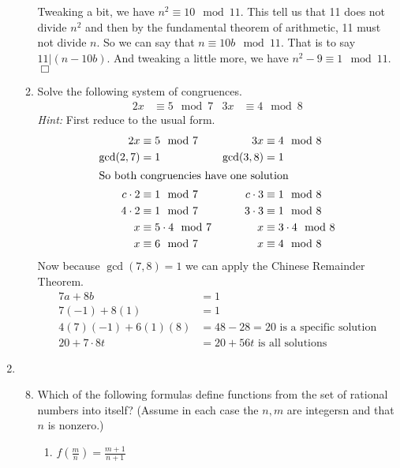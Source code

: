 \documentclass[letterpaper]{article}
\begin{document}
\begin{enumerate}
\begin{enumerate}
Tweaking a bit, we have $n^2\equiv10\mod11$.
This tell us that 11 does not divide $n^2$ and then by the fundamental theorem of arithmetic, 11 must not divide $n$. So we can say that $n\equiv10b\mod11$. That is to say  $11|(n-10b)$. 
And tweaking a little more, we have $n^2-9\equiv1\mod11$.
$\Box$
\setcounter{enumii}{19}
\item
Solve the following system of congruences.
\begin{align*}
  2x&\equiv 5\mod 7&3x&\equiv4\mod 8
\end{align*}
\emph{Hint:} First reduce to the usual form.
\begin{align*}
  2x&\equiv 5\mod 7&3x&\equiv4\mod 8\\
  \gcd(2,7)&=1&\gcd(3,8)&=1\\
  \intertext{So both congruencies have one solution}
  c\cdot2&\equiv1\mod 7&c\cdot3&\equiv1\mod8\\
  4\cdot2&\equiv1\mod 7&3\cdot3&\equiv1\mod8\\
  x&\equiv5\cdot4\mod7&x&\equiv3\cdot4\mod8\\
  x&\equiv6\mod7&x&\equiv4\mod8\\
\end{align*}
Now because $\gcd(7,8)=1$ we can apply the Chinese Remainder Theorem.
\begin{align*}
  7a+8b&=1\\
  7(-1)+8(1)&=1\\
  4(7)(-1)+6(1)(8)&=48-28=20\text{ is a specific solution}\\
  20+7\cdot8t&=20+56t\text{ is all solutions}
\end{align*}
\end{enumerate}
\renewcommand{\labelenumi}{2.\arabic{enumi}}
\setcounter{enumi}{0}
\item
\begin{enumerate}
\setcounter{enumii}{7}
\item
Which of the following formulas define functions from the set of rational numbers into itself? (Assume in each case the $n,m$ are integersn and that $n$ is nonzero.)
\begin{enumerate}
\item
$\displaystyle f\left(\frac{m}{n}\right)=\frac{m+1}{n+1}$


\end{enumerate}
\end{enumerate}
\end{enumerate}
\end{document}
